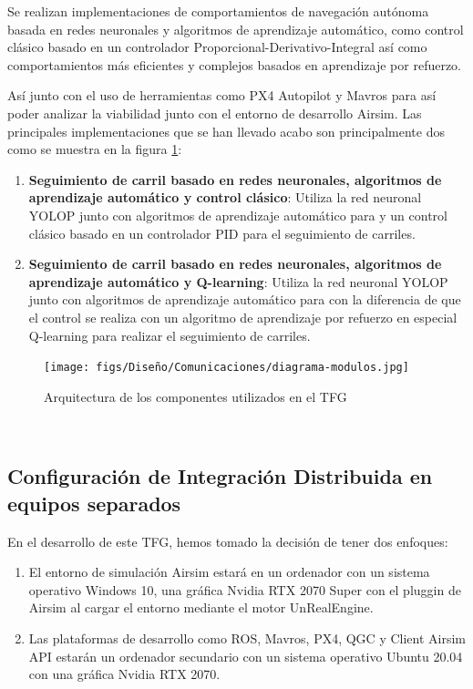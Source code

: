 Se realizan implementaciones de comportamientos de navegación autónoma basada en redes neuronales y algoritmos de aprendizaje automático, como control clásico basado en 
un controlador Proporcional-Derivativo-Integral así como comportamientos más eficientes y complejos basados en aprendizaje por refuerzo.

Así junto con el uso de herramientas como PX4 Autopilot y Mavros para así poder analizar la viabilidad junto con el entorno de desarrollo Airsim. Las principales implementaciones que se han 
llevado acabo son principalmente dos como se muestra en la figura \ref{fig:infraestructura}:

\begin{enumerate}
  \item \textbf{Seguimiento de carril basado en redes neuronales, algoritmos de aprendizaje automático y control clásico}: Utiliza la red neuronal YOLOP junto con algoritmos de aprendizaje automático para 
   y un control clásico basado en un controlador PID para el seguimiento de carriles.
  \item \textbf{Seguimiento de carril basado en redes neuronales, algoritmos de aprendizaje automático y Q-learning}: Utiliza la red neuronal YOLOP junto con algoritmos de aprendizaje automático para 
  con la diferencia de que el control se realiza con un algoritmo de aprendizaje por refuerzo en especial Q-learning para realizar el seguimiento de carriles.
\end{enumerate}

\begin{figure} [H]
    \begin{center}
      \texttt{[image: figs/Diseño/Comunicaciones/diagrama-modulos.jpg]}
    \end{center}
    \caption{Arquitectura de los componentes utilizados en el TFG}
    \label{fig:infraestructura}
  \end{figure}\

\subsection{Configuración de Integración Distribuida en equipos separados}
En el desarrollo de este TFG, hemos tomado la decisión de tener dos enfoques:

\begin{enumerate}
  \item El entorno de simulación Airsim estará en un ordenador con un sistema operativo Windows 10, una gráfica Nvidia RTX 2070 Super con el pluggin de 
  Airsim al cargar el entorno mediante el motor UnRealEngine.
  \item Las plataformas de desarrollo como ROS, Mavros, PX4, QGC y Client Airsim API estarán un  ordenador secundario con un sistema operativo Ubuntu 20.04 con una gráfica Nvidia RTX
  2070.
\end{enumerate}

